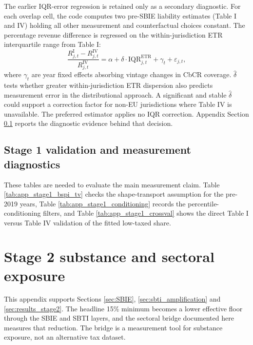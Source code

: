 \documentclass[11pt,a4paper]{article}
\begin{document}
The earlier IQR-error regression is retained only as a secondary diagnostic. For each overlap cell, the code computes two pre-SBIE liability estimates (Table I and IV) holding all other measurement and counterfactual choices constant. The percentage revenue difference is regressed on the within-jurisdiction ETR interquartile range from Table I:
\begin{equation}\label{eq:crossval_regression}
\frac{R_{j,t}^{\text{I}} - R_{j,t}^{\text{IV}}}{R_{j,t}^{\text{IV}}} = \alpha + \delta \cdot \text{IQR}_{j,t}^{\text{ETR}} + \gamma_t + \varepsilon_{j,t},
\end{equation}
where $\gamma_t$ are year fixed effects absorbing vintage changes in CbCR coverage. $\hat{\delta}$ tests whether greater within-jurisdiction ETR dispersion also predicts measurement error in the distributional approach. A significant and stable $\hat{\delta}$ could support a correction factor for non-EU jurisdictions where Table IV is unavailable. The preferred estimator applies no IQR correction. Appendix Section \ref{app:results_stage1} reports the diagnostic evidence behind that decision.

\subsection{Stage 1 validation and measurement diagnostics}\label{app:results_stage1}

These tables are needed to evaluate the main measurement claim. Table \ref{tab:app_stage1_bspi_tv} checks the shape-transport assumption for the pre-2019 years, Table \ref{tab:app_stage1_conditioning} records the percentile-conditioning filters, and Table \ref{tab:app_stage1_crossval} shows the direct Table I versus Table IV validation of the fitted low-taxed share.





\section{Stage 2 substance and sectoral exposure}\label{app:stage2_substance}

This appendix supports Sections \ref{sec:SBIE}, \ref{sec:sbti_amplification} and \ref{sec:results_stage2}. The headline 15\% minimum becomes a lower effective floor through the SBIE and SBTI layers, and the sectoral bridge documented here measures that reduction. The bridge is a measurement tool for substance exposure, not an alternative tax dataset.
\end{document}
